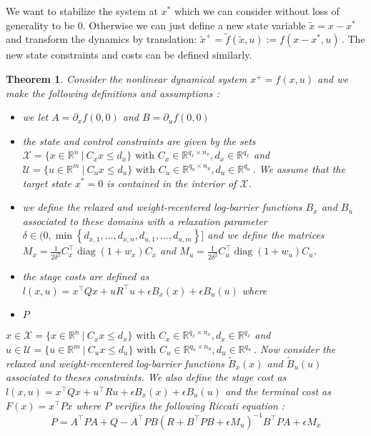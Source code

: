 \documentclass[12pt]{article}
\newtheorem{theorem}{Theorem}[section]
\numberwithin{theorem}{section} %
\theoremstyle{definition}
\theoremstyle{remark}
\def\cal#1{\mathcal{#1}}
\newcommand{\R}{\mathbb{R}}
\DeclareMathOperator{\diag}{diag}
\begin{document}
We want to stabilize the system at $x^*$ which we can consider without loss of generality to be 0.
Otherwise we can just define a new state variable $\tilde{x}=x-x^*$ and transform the dynamics by translation: $\tilde{x}^+=\tilde{f}(\tilde{x},u):=f(x-x^*,u)$\,.
The new state constraints and costs can be defined similarly.

\begin{theorem}
	Consider the nonlinear dynamical system $x^+=f(x,u)$ and we make the following definitions and assumptions : 
	\begin{itemize}[label=\textbullet]
		\item we let $A=\partial_xf(0,0)$ and $B=\partial_uf(0,0)$
		\item the state and control constraints are given by the sets $\cal{X}=\{x\in\R^n~|~C_xx\leq d_x\}\text{ with }C_x\in\R^{q_x\times n_x},d_x\in\R^{q_x}$ 
		and $\cal{U}=\{u\in\R^m~|~C_ux\leq d_u\}\text{ with }C_u\in\R^{q_u\times n_u},d_u\in\R^{q_u}$\,.
		We assume that the target state $x^*=0$ is contained in the interior of $\cal{X}$.
		\item we define the relaxed and weight-recentered log-barrier functions $B_x$ and $B_u$ associated to these domains with a relaxation parameter $\delta\in(0,\min\left\{d_{x,1},\dots,d_{x,n},d_{u,1},\dots,d_{u,m}\right\}]$ and we define the matrices 
		$M_x=\frac{1}{2\delta^2}C_x^\top\diag(1+w_x)C_x$ and $M_u=\frac{1}{2\delta^2}C_u^\top\diag(1+w_u)C_u$.

		\item the stage costs are defined as $l(x,u)=x^\top Qx+uR^\top u+\epsilon B_x(x)+\epsilon B_u(u)$ where 
		
		\item $P$
	\end{itemize}
	
	$x\in\cal{X}=\{x\in\R^n~|~C_xx\leq d_x\}\text{ with }C_x\in\R^{q_x\times n_x},d_x\in\R^{q_x}$ 
	and $u\in\cal{U}=\{u\in\R^m~|~C_ux\leq d_u\}\text{ with }C_u\in\R^{q_u\times n_u},d_u\in\R^{q_u}$\,.\newline
	Now consider the relaxed and weight-recentered log-barrier functions $\tilde{B}_x(x)$ and $\tilde{B}_u(u)$ associated to theses constraints.
	We also define the stage cost as $l(x,u)=x^\top Qx+u^\top Ru+\epsilon B_x(x)+\epsilon B_u(u)$ and the terminal cost as $F(x)=x^\top Px$ where $P$ verifies the following Riccati equation :
	$$P=A^\top PA+Q-A^\top PB(R+B^\top PB+\epsilon M_u)^{-1}B^\top PA+\epsilon M_x$$



\end{theorem}
\end{document}
